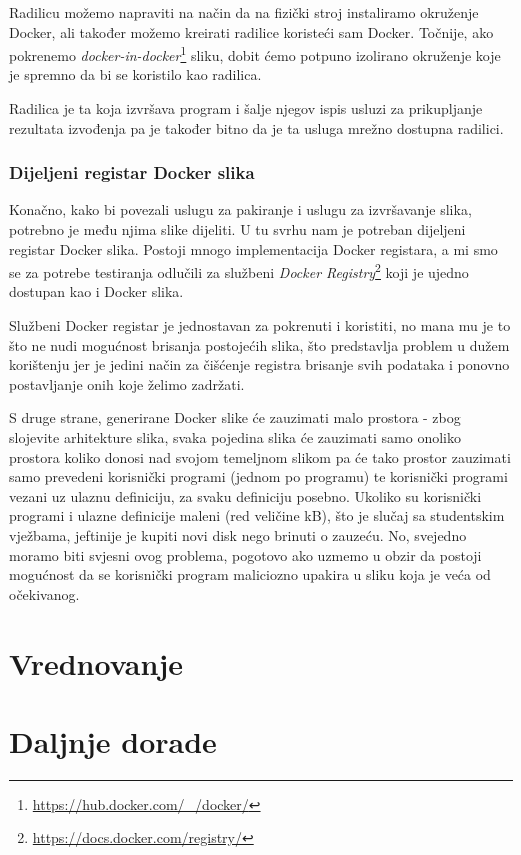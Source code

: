 \documentclass[times, utf8, zavrsni]{fer}
\begin{document}
{Radilicu možemo napraviti na način da na fizički stroj instaliramo okruženje Docker, ali također možemo kreirati radilice koristeći sam Docker. Točnije, ako pokrenemo {\textit{docker-in-docker}}{\footnote{\url{https://hub.docker.com/_/docker/}}} sliku, dobit ćemo potpuno izolirano okruženje koje je spremno da bi se koristilo kao radilica.

Radilica je ta koja izvršava program i šalje njegov ispis usluzi za prikupljanje rezultata izvođenja pa je također bitno da je ta usluga mrežno dostupna radilici.

\subsection{Dijeljeni registar Docker slika}

Konačno, kako bi povezali uslugu za pakiranje i uslugu za izvršavanje slika, potrebno je među njima slike dijeliti. U tu svrhu nam je potreban dijeljeni registar Docker slika. Postoji mnogo implementacija Docker registara, a mi smo se za potrebe testiranja odlučili za službeni {\textit{Docker Registry}}{\footnote{\url{https://docs.docker.com/registry/}}} koji je ujedno dostupan kao i Docker slika.

Službeni Docker registar je jednostavan za pokrenuti i koristiti, no mana mu je to što ne nudi mogućnost brisanja postojećih slika, što predstavlja problem u dužem korištenju jer je jedini način za čišćenje registra brisanje svih podataka i ponovno postavljanje onih koje želimo zadržati.

S druge strane, generirane Docker slike će zauzimati malo prostora - zbog slojevite arhitekture slika, svaka pojedina slika će zauzimati samo onoliko prostora koliko donosi nad svojom temeljnom slikom pa će tako prostor zauzimati samo prevedeni korisnički programi (jednom po programu) te korisnički programi vezani uz ulaznu definiciju, za svaku definiciju posebno. Ukoliko su korisnički programi i ulazne definicije maleni (red veličine kB), što je slučaj sa studentskim vježbama, jeftinije je kupiti novi disk nego brinuti o zauzeću. No, svejedno moramo biti svjesni ovog problema, pogotovo ako uzmemo u obzir da postoji mogućnost da se korisnički program maliciozno upakira u sliku koja je veća od očekivanog.

\chapter{Vrednovanje}

\chapter{Daljnje dorade}

}
\end{document}
